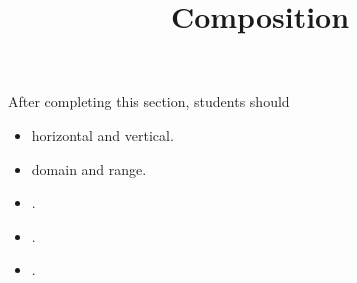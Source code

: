 \documentclass{ximera}
\title{Composition}
\begin{document}
\begin{abstract}
\end{abstract}
\maketitle

\begin{sectionOutcomes}
After completing this section, students should 

\begin{itemize}
\item horizontal and vertical.
\item domain and range.
\item .
\item .
\item .
\end{itemize}
\end{sectionOutcomes}
\end{document}
